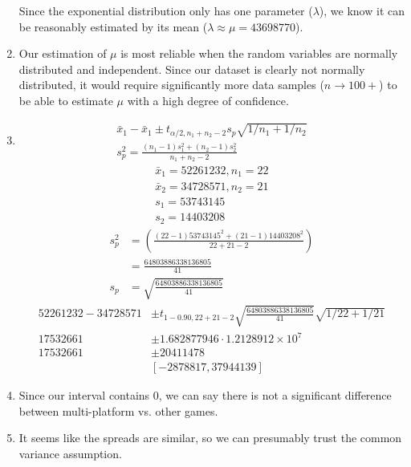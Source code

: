 \documentclass{article}
\begin{document}
\begin{enumerate}[label=(\alph*)]
          Since the exponential distribution only has one parameter (\(\lambda\)), we know it can be reasonably estimated by its mean (\(\lambda \approx \mu = 43698770\)).
    \item Our estimation of \(\mu\) is most reliable when the random variables are normally distributed and independent. Since our dataset is clearly not normally distributed, it would require significantly more data samples (\(n \rightarrow 100+\)) to be able to estimate \(\mu\) with a high degree of confidence.
    \item \begin{align*}
              \bar{x}_1 - \bar{x}_1 \pm t_{\alpha/2,n_1+n_2-2} s_p \sqrt{1/n_1 + 1/n_2} \\
              s_p^2 = \frac{(n_1-1)s_1^2+(n_2-1)s_2^2}{n_1+n_2-2}
          \end{align*}
          \begin{align*}
              \bar{x}_1 = 52261232 , n_1 = 22 \\
              \bar{x}_2 = 34728571 , n_2 = 21 \\
              s_1                  = 53743145 \\
              s_2                  = 14403208
          \end{align*}
          \begin{align*}
              s_p^2 & = (\frac{(22 - 1) 53743145^2 + (21 - 1) 14403208^2}{22 + 21 - 2}) \\
                    & = \frac{64803886338136805}{41}                                    \\
              s_p   & = \sqrt{\frac{64803886338136805}{41}}
          \end{align*}
          \begin{align*}
              52261232 - 34728571 & \pm t_{1-0.90, 22+21-2} \sqrt{\frac{64803886338136805}{41}} \sqrt{1/22 + 1/21} \\
              17532661            & \pm 1.682877946 \cdot 1.2128912 \times 10^7                                    \\
              17532661            & \pm 20411478                                                                   \\
                                  & [-2878817, 37944139]
          \end{align*}
    \item Since our interval contains 0, we can say there is not a significant difference between multi-platform vs. other games.
    \item It seems like the spreads are similar, so we can presumably trust the common variance assumption.
\end{enumerate}
\end{document}
